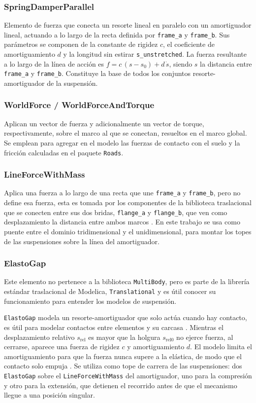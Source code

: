 \subsubsection{SpringDamperParallel} 
Elemento de fuerza que conecta un resorte lineal en paralelo con un amortiguador lineal, actuando a lo largo de la recta definida por \verb|frame_a| y \verb|frame_b|. Sus parámetros se componen de la constante de rigidez $c$, el coeficiente de amortiguamiento $d$ y la longitud sin estirar \verb|s_unstretched|. La fuerza resultante a lo largo de la línea de acción es $f = c\,(s - s_0) + d\,\dot{s}$, siendo $s$ la distancia entre \verb|frame_a| y \verb|frame_b|. Constituye la base de todos los conjuntos resorte-amortiguador de la suspensión.

\subsubsection{WorldForce / WorldForceAndTorque}
Aplican un vector de fuerza y adicionalmente un vector de torque, respectivamente, sobre el marco al que se conectan, resueltos en el marco global. Se emplean para agregar en el modelo las fuerzas de contacto con el suelo y la fricción calculadas en el paquete \verb|Roads|.

\subsubsection{LineForceWithMass}
Aplica una fuerza a lo largo de una recta que une \verb|frame_a| y \verb|frame_b|, pero no define esa fuerza, esta es tomada por los componentes de la biblioteca traslacional que se conecten entre sus dos bridas, \verb|flange_a| y \verb|flange_b|, que ven como desplazamiento la distancia entre ambos marcos \cite{msl_multibody}. En este trabajo se usa como puente entre el dominio tridimensional y el unidimensional, para montar los topes de las suspensiones sobre la línea del amortiguador.


\subsubsection{ElastoGap}

Este elemento no pertenece a la biblioteca \verb|MultiBody|, pero es parte de la librería estándar traslacional de Modelica, \verb|Translational| y es útil conocer su funcionamiento para entender los modelos de suspensión.

\verb|ElastoGap| modela un resorte-amortiguador que solo actúa cuando hay contacto, es útil para modelar contactos entre elementos y su carcasa \cite{msl_translational}. Mientras el desplazamiento relativo $s_\text{rel}$ es mayor que la holgura $s_\text{rel0}$ no ejerce fuerza, al cerrarse, aparece una fuerza de rigidez $c$ y amortiguamiento $d$. El modelo limita el amortiguamiento para que la fuerza nunca supere a la elástica, de modo que el contacto solo empuja \cite{msl_translational}. Se utiliza como tope de carrera de las suspensiones: dos \verb|ElastoGap| sobre el \verb|LineForceWithMass| del amortiguador, uno para la compresión y otro para la extensión, que detienen el recorrido antes de que el mecanismo llegue a una posición singular.

